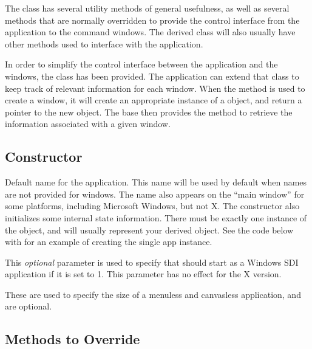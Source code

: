 The  class has several utility methods of general
usefulness, as well as several methods that are normally
overridden to provide the control interface from the application
to the command windows. The derived class will
also usually have other methods used to interface with the
application.

In order to simplify the control interface between the application
and the windows, the  class has been provided.
The application can extend that class to keep track of
relevant information for each window. When the 
method is used to create a window, it will create an
appropriate instance of a  object, and return
a pointer to the new object. The
base  then provides the method 
to retrieve the information associated with a given window.

\subsection* {Constructor} %


 Default name for the application. This name
will be used by default when names are not provided for windows.
The name also appears on the ``main window'' for some platforms,
including Microsoft Windows, but not X.
The constructor also initializes some internal state information.
There must be exactly one instance of the  object, and
will usually represent your derived  object. See the
code below with  for an example of creating the
single app instance.

 This \emph{optional} parameter is used to specify
that \V should start as a Windows SDI application if it is set
to 1. This parameter has no effect for the X version.

 These are used to specify the size of a
menuless and canvasless \V application, and are optional.

\subsection* {Methods to Override} %


